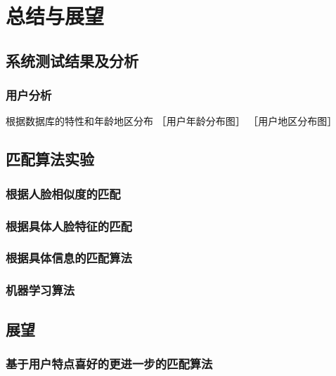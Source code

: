
\chapter{总结与展望}
\section{系统测试结果及分析}
\subsection{用户分析}
根据数据库的特性和年龄地区分布
［用户年龄分布图］
［用户地区分布图］

\section{匹配算法实验}
\subsection{根据人脸相似度的匹配}
\subsection{根据具体人脸特征的匹配}
\subsection{根据具体信息的匹配算法}
\subsection{机器学习算法}


\section{展望}
\subsection{基于用户特点喜好的更进一步的匹配算法}

